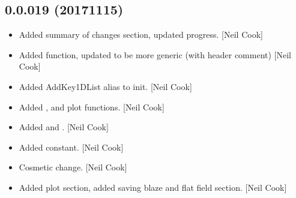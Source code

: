 \documentclass[a4paper,10pt,english]{report}
\begin{document}
\subsection{0.0.019 (2017\sphinxhyphen{}11\sphinxhyphen{}15)}
\label{\detokenize{misc/changelog:id550}}\begin{itemize}
\item {} 
Added  summary of changes section, updated progress. {[}Neil
Cook{]}

\item {} 
Added  function, updated  to be more
generic (with header comment) {[}Neil Cook{]}

\item {} 
Added AddKey1DList alias to init. {[}Neil Cook{]}

\item {} 
Added ,
 and  plot
functions. {[}Neil Cook{]}

\item {} 
Added  and . {[}Neil Cook{]}

\item {} 
Added  constant. {[}Neil Cook{]}

\item {} 
Cosmetic change. {[}Neil Cook{]}

\item {} 
Added plot section, added saving blaze and flat field section. {[}Neil
Cook{]}

\end{itemize}
\end{document}
